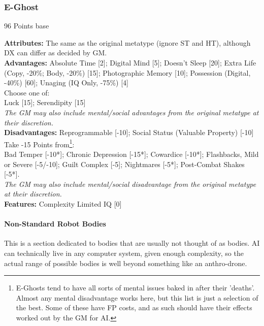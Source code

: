 \begin{multicols*}{3}
	\subsubsection*{E-Ghost}
	\begin{flushright}
		96 Points base
	\end{flushright}
	\textbf{Attributes:} 
	The same as the original metatype (ignore ST and HT), although DX can differ as decided by GM.
	\\\textbf{Advantages:} 
	Absolute Time [2]; Digital Mind [5]; Doesn't Sleep [20]; Extra Life (Copy, -20\%; Body, -20\%) [15]; Photographic Memory [10]; Possession (Digital, -40\%) [60]; Unaging (IQ Only, -75\%) [4]
	\\
	Choose one of: \\
	Luck [15]; Serendipity [15]
	\\
	\textit{The GM may also include mental/social advantages from the original metatype at their discretion.}
	\\\textbf{Disadvantages:} 
	Reprogrammable [-10]; Social Status (Valuable Property) [-10]
	\\
	Take -15 Points from\footnote{E-Ghosts tend to have all sorts of mental issues baked in after their 'deaths'. Almost any mental disadvantage works here, but this list is just a selection of the best. Some of these have FP costs, and as such should have their effects worked out by the GM for AI.}:\\
	Bad Temper [-10*]; Chronic Depression [-15*]; Cowardice [-10*]; Flashbacks, Mild or Severe [-5/-10];  Guilt Complex [-5]; Nightmares [-5*]; Post-Combat Shakes [-5*].
	\\
	\textit{The GM may also include mental/social disadvantage from the original metatype at their discretion.}
	\\\textbf{Features:}
	Complexity Limited IQ [0]
	
	\paragraph{Non-Standard Robot Bodies}
	
	This is a section dedicated to bodies that are usually not thought of as bodies. AI can technically live in any computer system, given enough complexity, so the actual range of possible bodies is well beyond something like an anthro-drone.
	

\end{multicols*}
